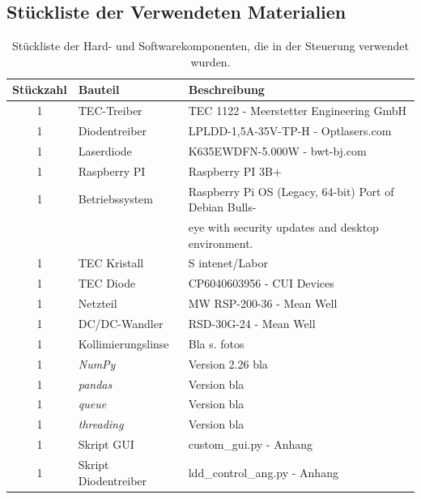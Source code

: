 \begin{appendix}
\subsection{Stückliste der Verwendeten Materialien}
\begin{table}[H]
    \centering
    \begin{tabular}{c|l|l}
        Stückzahl& \textbf{Bauteil}&       \textbf{Beschreibung}\\
        \hline
        1&          TEC-Treiber&           TEC 1122 - Meerstetter Engineering GmbH\\
        1&          Diodentreiber&         LPLDD-1,5A-35V-TP-H - Optlasers.com\\
        1&          Laserdiode&            K635EWDFN-5.000W - bwt-bj.com\\
        1&          Raspberry PI&          Raspberry PI 3B+\\
        1&          Betriebssystem&        Raspberry Pi OS (Legacy, 64-bit) Port of Debian Bulls-\\
        &           &                      eye with security updates and desktop environment.\\
        1&          TEC Kristall&          S intenet/Labor\\
        1&          TEC Diode&             CP6040603956 - CUI Devices\\
        1&          Netzteil&              MW RSP-200-36 - Mean Well\\
        1&          DC/DC-Wandler&         RSD-30G-24 - Mean Well\\
        1&          Kollimierungslinse&    Bla s. fotos\\
        1&          \textit{NumPy}&        Version 2.26 bla\\
        1&          \textit{pandas}&       Version bla\\
        1&          \textit{queue}&        Version bla\\
        1&          \textit{threading}&    Version bla\\
        1&          Skript GUI&            custom\_gui.py - Anhang\\
        1&          Skript Diodentreiber&  ldd\_control\_ang.py - Anhang\\
    \end{tabular}
    \caption{Stückliste der Hard- und Softwarekomponenten, die in der Steuerung verwendet wurden.}
    \label{tab:bom}
\end{table}


\end{appendix}
